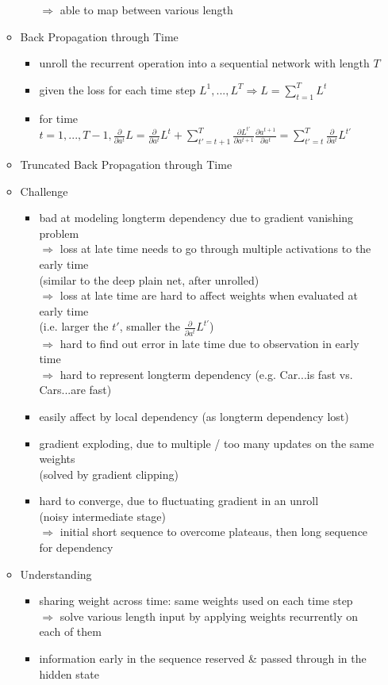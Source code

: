 \begin{itemize}
\begin{itemize}
\begin{itemize}
		$\Rightarrow$ able to map between various length
		\end{itemize}
	\item Back Propagation through Time
		\begin{itemize}
		\item unroll the recurrent operation into a sequential network with length $T$
		\item given the loss for each time step $L^1,...,L^T \Rightarrow L = \sum_{t=1}^T L^t$
		\item for time $\displaystyle t=1,...,T-1, \frac {\partial} {\partial a^t} L = \frac {\partial} {\partial a^t} L^t + \sum_{t'=t+1}^T\frac {\partial L^{t'}} {\partial a^{t+1}} \frac {\partial a^{t+1}} {\partial a^t} = \sum_{t'=t}^T \frac {\partial} {\partial a^t} L^{t'}$
		\end{itemize}
	\item Truncated Back Propagation through Time
	\item Challenge
		\begin{itemize}
		\item bad at modeling longterm dependency due to gradient vanishing problem \\
		$\Rightarrow$ loss at late time needs to go through multiple activations to the early time \\
		(similar to the deep plain net, after unrolled) \\
		$\Rightarrow$ loss at late time are hard to affect weights when evaluated at early time \\
		(i.e. larger the $t'$, smaller the $\frac {\partial} {\partial a^t} L^{t'}$) \\
		$\Rightarrow$ hard to find out error in late time due to observation in early time \\ 
		$\Rightarrow$ hard to represent longterm dependency 
		(e.g. Car...is fast vs. Cars...are fast)
		\item easily affect by local dependency (as longterm dependency lost)
		\item gradient exploding, due to multiple / too many updates on the same weights \\
		(solved by gradient clipping)
		\item hard to converge, due to fluctuating gradient in an unroll \\ 
		(noisy intermediate stage) \\
		$\Rightarrow$ initial short sequence to overcome plateaus, then long sequence for dependency
		\end{itemize}
	\item Understanding
		\begin{itemize}
		\item sharing weight across time: same weights used on each time step \\
		$\Rightarrow$ solve various length input by applying weights recurrently on each of them
		\item information early in the sequence reserved \& passed through in the hidden state
		\end{itemize}
	\end{itemize}


\end{itemize}
